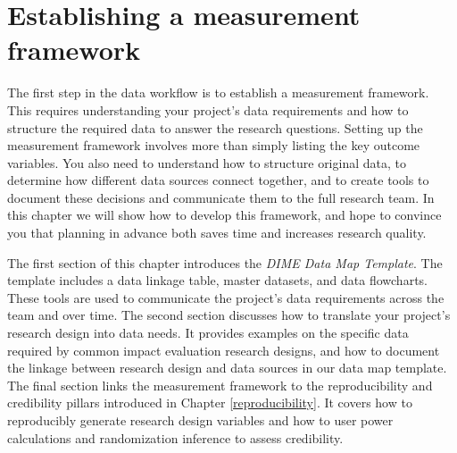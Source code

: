 \documentclass[
]{book}
\begin{document}
\hypertarget{measurement}{%
\chapter{Establishing a measurement framework}\label{measurement}}

The first step in the data workflow is to establish a measurement framework.
This requires understanding your project's data requirements
and how to structure the required data to answer the research questions.
Setting up the measurement framework involves more than
simply listing the key outcome variables.
You also need to understand how to structure original data,
to determine how different data sources connect together,
and to create tools to document these decisions and
communicate them to the full research team.
In this chapter we will show how to develop this framework,
and hope to convince you that planning in advance both
saves time and increases research quality.

The first section of this chapter
introduces the \emph{DIME Data Map Template}.
The template includes a data linkage table,
master datasets, and data flowcharts.
These tools are used to communicate the project's data requirements
across the team and over time.
The second section discusses how to
translate your project's research design into data needs.
It provides examples on the specific data required by
common impact evaluation research designs,
and how to document the linkage between
research design and data sources in our data map template.
The final section links the measurement framework to the
reproducibility and credibility pillars introduced in Chapter \ref{reproducibility}.
It covers how to reproducibly generate research design variables
and how to user power calculations and randomization inference
to assess credibility.
\end{document}
